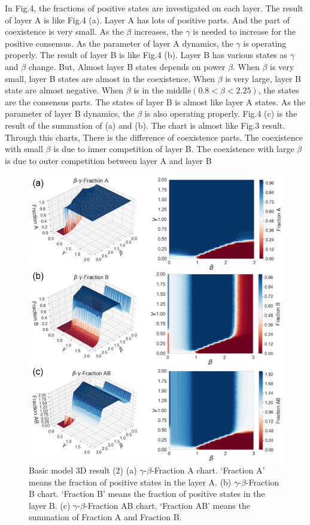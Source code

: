 \documentclass[english]{cccconf}
\begin{document}
In Fig.4, the fractions of positive states are investigated on each layer. The result of layer A is like Fig.4 (a). Layer A has lots of positive parts. And the part of coexistence is very small. As the $\beta$ increases, the $\gamma$ is needed to increase for the positive consensus. As the parameter of layer A dynamics, the $\gamma$ is operating properly. The result of layer B is like Fig.4 (b). Layer B has various states as $\gamma$ and $\beta$ change. But, Almost layer B states depends on power $\beta$.  When $\beta$ is very small, layer B states are almost in the coexistence. When $\beta$ is very large, layer B state are almost negative. When $\beta$ is in the middle$(0.8 < \beta < 2.25)$, the states are the consensus parts. The states of layer B is almost like layer A states. As the parameter of layer B dynamics, the $\beta$ is also operating properly. Fig.4 (c) is the result of the summation of (a) and (b). The chart is almost like Fig.3 result. Through this charts,
There is the difference of coexistence parts. The coexistence with small $\beta$ is due to inner competition of layer B. The coexistence with large $\beta$ is due to outer competition between layer A and layer B
\begin{figure}[!htb]
  \centering
  \includegraphics[width=\hsize]{FIG4.png}
  \caption{Basic model 3D result (2) (a) $\gamma$-$\beta$-Fraction A chart. ‘Fraction A’ means the fraction of positive states in the layer A. (b) $\gamma$-$\beta$-Fraction B chart. ‘Fraction B’ means the fraction of positive states in the layer B. (c) $\gamma$-$\beta$-Fraction AB chart. ‘Fraction AB’ means the summation of Fraction A and Fraction B.}
  \label{Fig4}
\end{figure}
\end{document}
